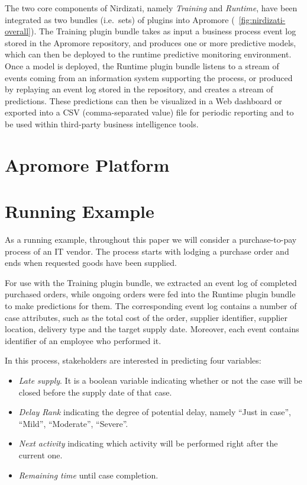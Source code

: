 \documentclass[runningheads,a4paper]{llncs}
\begin{document}
The two core components of Nirdizati, namely \textit{Training} and \textit{Runtime}, have been integrated as two bundles (i.e.\ sets) of plugins into Apromore (\figurename~\ref{fig:nirdizati-overall}). The Training plugin bundle takes as input a business process event log stored in the Apromore repository, and produces one or more predictive models, which can then be deployed to the runtime predictive monitoring environment. Once a model is deployed, the Runtime plugin bundle listens to a stream of events coming from an information system supporting the process, or produced by replaying an event log stored in the repository, and creates a stream of predictions. These predictions can then be visualized in a Web dashboard or exported into a CSV (comma-separated value) file for periodic reporting and to be used within third-party business intelligence tools.

\section{Apromore Platform}


\section{Running Example}
As a running example, throughout this paper we will consider a purchase-to-pay process of an IT vendor. The process starts with lodging a purchase order and ends when requested goods have been supplied. 

For use with the Training plugin bundle, we extracted an event log of completed purchased orders, while ongoing orders were fed into the Runtime plugin bundle to make predictions for them. The corresponding event log contains a number of case attributes, such as the total cost of the order, supplier identifier, supplier location, delivery type and the target supply date. Moreover, each event contains identifier of an employee who performed it.

In this process, stakeholders are interested in predicting four variables:
\begin{itemize}
	\item \emph{Late supply}. It is a boolean variable indicating whether or not the case will be closed before the supply date of that case.
	\item \emph{Delay Rank} indicating the degree of potential delay, namely ``Just in case'', ``Mild'', ``Moderate'', ``Severe''.
	\item \emph{Next activity} indicating which activity will be performed right after the current one.
	\item \emph{Remaining time} until case completion.
\end{itemize}
\end{document}
